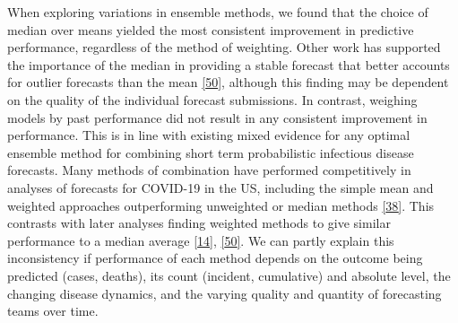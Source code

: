 \documentclass[
]{article}
\providecommand{\DIFaddbegin}{} %
\providecommand{\DIFaddend}{} %
\providecommand{\DIFdelbegin}{} %
\providecommand{\DIFdelend}{} %
\newcommand{\DIFscaledelfig}{0.5}
\newlength{\DIFdelgraphicswidth} %
\newlength{\DIFdelgraphicsheight} %
\newcommand{\DIFaddincludegraphics}[2][]{{\color{blue}\fbox{\DIFOincludegraphics[#1]{#2}}}} %
\newcommand{\DIFdelincludegraphics}[2][]{%
\sbox{\DIFdelgraphicsbox}{\DIFOincludegraphics[#1]{#2}}%
\settoboxwidth{\DIFdelgraphicswidth}{\DIFdelgraphicsbox} %
\settoboxtotalheight{\DIFdelgraphicsheight}{\DIFdelgraphicsbox} %
\scalebox{\DIFscaledelfig}{%
\parbox[b]{\DIFdelgraphicswidth}{\usebox{\DIFdelgraphicsbox}\\[-\baselineskip] \rule{\DIFdelgraphicswidth}{0em}}\llap{\resizebox{\DIFdelgraphicswidth}{\DIFdelgraphicsheight}{%
\setlength{\unitlength}{\DIFdelgraphicswidth}%
\begin{picture}(1,1)%
\thicklines\linethickness{2pt} %
{\color[rgb]{1,0,0}\put(0,0){\framebox(1,1){}}}%
{\color[rgb]{1,0,0}\put(0,0){\line( 1,1){1}}}%
{\color[rgb]{1,0,0}\put(0,1){\line(1,-1){1}}}%
\end{picture}%
}\hspace*{3pt}}} %
} %
\DeclareRobustCommand{\DIFaddbegin}{\DIFOaddbegin \let\includegraphics\DIFaddincludegraphics} %
\DeclareRobustCommand{\DIFaddend}{\DIFOaddend \let\includegraphics\DIFOincludegraphics} %
\DeclareRobustCommand{\DIFdelbegin}{\DIFOdelbegin \let\includegraphics\DIFdelincludegraphics} %
\DeclareRobustCommand{\DIFdelend}{\DIFOaddend \let\includegraphics\DIFOincludegraphics} %
\begin{document}
When exploring variations in ensemble methods, we found that the choice of median over means yielded the most consistent improvement in predictive performance, regardless of the method of weighting. Other work has supported the importance of the median in providing a stable forecast that better accounts for outlier forecasts than the mean \protect\DIFdelbegin %
\DIFdelend \DIFaddbegin \hyperlink{ref-brooksComparingEnsembleApproaches2020}{{[}50{]}}\DIFaddend , although this finding may be dependent on the quality of the individual forecast submissions. In contrast, weighing models by past performance did not result in any consistent improvement in performance. This is in line with existing mixed evidence for any optimal ensemble method for combining short term probabilistic infectious disease forecasts. Many methods of combination have performed competitively in analyses of forecasts for COVID-19 in the US, including the simple mean and weighted approaches outperforming unweighted or median methods \protect\DIFdelbegin %
\DIFdelend \DIFaddbegin \hyperlink{ref-taylorCombiningProbabilisticForecasts2021}{{[}38{]}}\DIFaddend . This contrasts with later analyses finding weighted methods to give similar performance to a median average \protect\DIFdelbegin %
\DIFdelend \DIFaddbegin \hyperlink{ref-rayEnsembleForecastsCoronavirus2020e}{{[}14{]}}\DIFaddend , \protect\DIFdelbegin %
\DIFdelend \DIFaddbegin \hyperlink{ref-brooksComparingEnsembleApproaches2020}{{[}50{]}}\DIFaddend . We can partly explain this inconsistency if performance of each method depends on the outcome being predicted (cases, deaths), its count (incident, cumulative) and absolute level, the changing disease dynamics, and the varying quality and quantity of forecasting teams over time.
\end{document}
